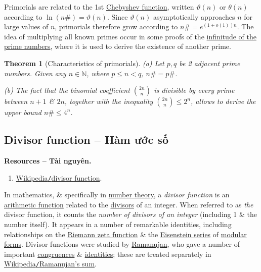 \documentclass{article}
\newtheorem{theorem}{Theorem}
\begin{document}
Primorials are related to the 1st \href{https://en.wikipedia.org/wiki/Chebyshev_function}{Chebyshev function}, written $\vartheta(n)$ or $\theta(n)$ according to $\ln(n\#) = \vartheta(n)$. Since $\vartheta(n)$ asymptotically approaches $n$ for large values of $n$, primorials therefore grow according to $n\# = e^{(1 + o(1))n}$. The idea of multiplying all known primes occur in some proofs of the \href{https://en.wikipedia.org/wiki/Infinitude_of_the_prime_numbers}{infinitude of the prime numbers}, where it is used to derive the existence of another prime.

\begin{theorem}[Characteristics of primorials]
	(a) Let $p,q$ be 2 adjacent prime numbers. Given any $n\in\mathbb{N}$, where $p\le n < q$, $n\# = p\#$.
	\item(b) The fact that the binomial coefficient $\binom{2n}{n}$ is divisible by every prime between $n + 1$ \& $2n$, together with the inequality $\binom{2n}{n}\le2^n$, allows to derive the upper bound $n\#\le4^n$.
\end{theorem}


\subsection{Divisor function -- Hàm ước số}
\textbf{\textsf{Resources -- Tài nguyên.}}
\begin{enumerate}
	\item \href{https://en.wikipedia.org/wiki/Divisor_function}{Wikipedia{\tt/}divisor function}.
\end{enumerate}
In mathematics, \& specifically in \href{https://en.wikipedia.org/wiki/Number_theory}{number theory}, a {\it divisor function} is an \href{https://en.wikipedia.org/wiki/Arithmetic_function}{arithmetic function} related to the \href{https://en.wikipedia.org/wiki/Divisor}{divisors} of an integer. When referred to as {\it the} divisor function, it counts the {\it number of divisors of an integer} (including 1 \& the number itself). It appears in a number of remarkable identities, including relationships on the \href{https://en.wikipedia.org/wiki/Riemann_zeta_function}{Riemann zeta function} \& the \href{https://en.wikipedia.org/wiki/Eisenstein_series}{Eisenstein series} of \href{https://en.wikipedia.org/wiki/Modular_form}{modular forms}. Divisor functions were studied by \href{https://en.wikipedia.org/wiki/Ramanujan}{\sc Ramanujan}, who gave a number of important \href{https://en.wikipedia.org/wiki/Modular_arithmetic}{congruences} \& \href{https://en.wikipedia.org/wiki/Identity_(mathematics)}{identities}; these are treated separately in \href{https://en.wikipedia.org/wiki/Ramanujan%27s_sum}{Wikipedia{\tt/}Ramanujan's sum}.
\end{document}
